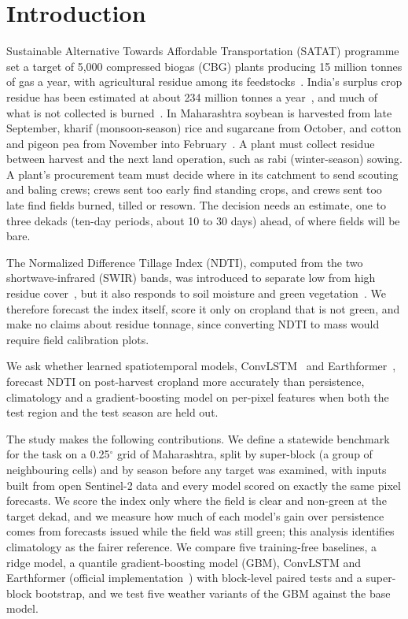 \documentclass[journal]{IEEEtran}
\begin{document}
\section{Introduction}
 Sustainable Alternative Towards Affordable Transportation (SATAT) programme set a target of 5,000 compressed biogas (CBG) plants producing 15 million tonnes of gas a year, with agricultural residue among its feedstocks~\cite{satat}. India's surplus crop residue has been estimated at about 234 million tonnes a year~\cite{hiloidhari}, and much of what is not collected is burned~\cite{jain,jethva}. In Maharashtra soybean is harvested from late September, kharif (monsoon-season) rice and sugarcane from October, and cotton and pigeon pea from November into February~\cite{desharvest}. A plant must collect residue between harvest and the next land operation, such as rabi (winter-season) sowing. A plant's procurement team must decide where in its catchment to send scouting and baling crews; crews sent too early find standing crops, and crews sent too late find fields burned, tilled or resown. The decision needs an estimate, one to three dekads (ten-day periods, about 10 to 30 days) ahead, of where fields will be bare.

The Normalized Difference Tillage Index (NDTI), computed from the two shortwave-infrared (SWIR) bands, was introduced to separate low from high residue cover~\cite{vandeventer}, but it also responds to soil moisture and green vegetation~\cite{quemada,zheng}. We therefore forecast the index itself, score it only on cropland that is not green, and make no claims about residue tonnage, since converting NDTI to mass would require field calibration plots.

We ask whether learned spatiotemporal models, ConvLSTM~\cite{convlstm} and Earthformer~\cite{earthformer}, forecast NDTI on post-harvest cropland more accurately than persistence, climatology and a gradient-boosting model on per-pixel features when both the test region and the test season are held out.

The study makes the following contributions. We define a statewide benchmark for the task on a 0.25$^\circ$ grid of Maharashtra, split by super-block (a group of neighbouring cells) and by season before any target was examined, with inputs built from open Sentinel-2 data and every model scored on exactly the same pixel forecasts. We score the index only where the field is clear and non-green at the target dekad, and we measure how much of each model's gain over persistence comes from forecasts issued while the field was still green; this analysis identifies climatology as the fairer reference. We compare five training-free baselines, a ridge model, a quantile gradient-boosting model (GBM), ConvLSTM and Earthformer (official implementation~\cite{earthformercode}) with block-level paired tests and a super-block bootstrap, and we test five weather variants of the GBM against the base model.
\end{document}
